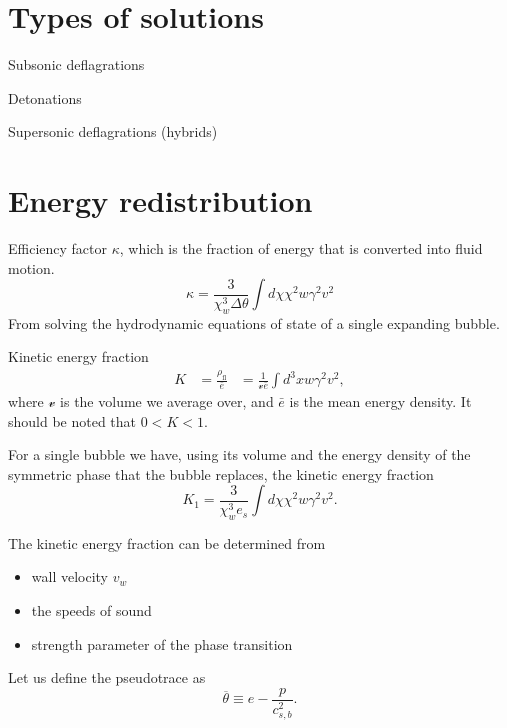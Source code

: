 \section{Types of solutions}

Subsonic deflagrations

Detonations

Supersonic deflagrations (hybrids)


\section{Energy redistribution}
Efficiency factor $\kappa$, which is the fraction of energy that is converted into fluid motion.
\begin{equation}
\kappa = \frac{3}{\chi_w^3 \Delta \theta} \int d\chi \chi^2 w \gamma^2 v^2
\end{equation}
From solving the hydrodynamic equations of state of a single expanding bubble.

Kinetic energy fraction
\cites[eq. 7.36]{lecture_notes}[eq. 5]{giese_2020}
\begin{align}
K
&= \frac{\rho_\text{fl}}{\bar{e}}
&= \frac{1}{\mathcal{v} \bar{e}} \int d^3 x w \gamma^2 v^2,
\end{align}
where $\mathcal{v}$ is the volume we average over, and $\bar{e}$ is the mean energy density.
It should be noted that $0 < K < 1$.
\cite{giese_2020}

For a single bubble we have, using its volume and the energy density of the symmetric phase that the bubble replaces, the kinetic energy fraction
\cites[eq. 7.37]{lecture_notes}[eq. 5]{giese_2020}
\begin{equation}
K_1 = \frac{3}{\chi_w^3 e_s} \int d\chi \chi^2 w \gamma^2 v^2.
\end{equation}

The kinetic energy fraction can be determined from
\begin{itemize}
\item wall velocity $v_w$
\item the speeds of sound
\item strength parameter of the phase transition
\end{itemize}

Let us define the pseudotrace as
\cites[eq. 34]{giese_2020}[eq. 1]{giese_2021}
\begin{equation}
\overline{\theta} \equiv e - \frac{p}{c_{s,b}^2}.
\end{equation}

